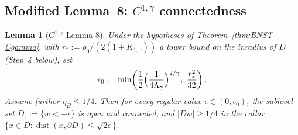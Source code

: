 \documentclass[11pt]{amsart}
\newtheorem{lemma}[theorem]{Lemma}
\DeclareMathOperator{\dist}{dist}
\begin{document}
\subsection{Modified Lemma~8: $C^{1,\gamma}$ connectedness}
\label{ss:BNST8-Cgamma}

\begin{lemma}[$C^{1,\gamma}$ Lemma 8]\label{lem:BNST8-Cgamma}
Under the hypotheses of Theorem~\ref{thm:BNST-Cgamma}, with
$r_*:=\rho_0/(2(1+K_{1,\gamma}))$ a lower bound on the inradius of
$D$ \textup{(}Step~4 below\textup{)}, set
\begin{equation}\label{eq:eps0-Cgamma}
   \epsilon_0:=\min\!\left(
     \frac{1}{2}\Bigl(\frac{1}{4\Lambda_\gamma}\Bigr)^{2/\gamma},\
     \frac{r_*^{2}}{32}\right).
\end{equation}
Assume further $\eta_B\le 1/4$.  Then for every regular value
$\epsilon\in(0,\epsilon_0)$, the sublevel set $D_\epsilon:=\{w<-
\epsilon\}$ is open and connected, and $|Dw|\ge 1/4$ in the collar
$\{x\in D:\dist(x,\partial D)\le\sqrt{2\epsilon}\}$.
\end{lemma}
\end{document}
